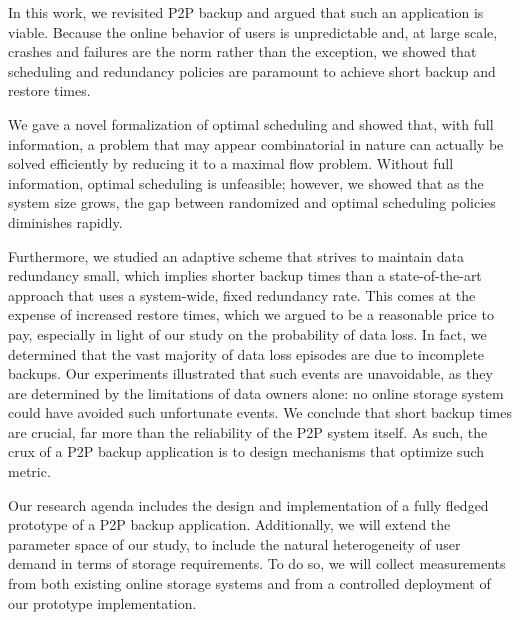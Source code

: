 \documentclass[conference,10pt]{IEEEtran}
\begin{document}
In this work, we revisited P2P backup and argued that such an
application is viable. Because the online behavior of users is
unpredictable and, at large scale, crashes and failures are the norm
rather than the exception, we showed that scheduling and redundancy
policies are paramount to achieve short backup and restore times.


We gave a novel formalization of optimal scheduling and showed that,
with full information, a problem that may appear combinatorial in
nature can actually be solved efficiently by reducing it to a maximal
flow problem. Without full information, optimal scheduling is
unfeasible; however, we showed that as the system size grows,
the gap between randomized and optimal scheduling policies diminishes rapidly. 

Furthermore, we studied an adaptive scheme that strives to maintain
data redundancy small, which implies shorter backup times than
a state-of-the-art approach that uses a system-wide, fixed redundancy
rate. This comes at the expense of increased restore times, which we
argued to be a reasonable price to pay, especially in light of our
study on the probability of data loss. In fact, we determined that the
vast majority of data loss episodes are due to incomplete backups. 
Our experiments illustrated that such events are unavoidable, as they
are determined by the limitations of data owners alone: no online
storage system could have avoided such unfortunate events.
We conclude that short backup times are crucial, far more than the
reliability of the P2P system itself. As such, the crux of a P2P
backup application is to design mechanisms that optimize such metric.

Our research agenda includes the design and implementation of a fully
fledged prototype of a P2P backup application. Additionally, we will
extend the parameter space of our study, to include the natural
heterogeneity of user demand in terms of storage requirements. To do
so, we will collect measurements from both existing online storage
systems and from a controlled deployment of our prototype
implementation.




\end{document}
